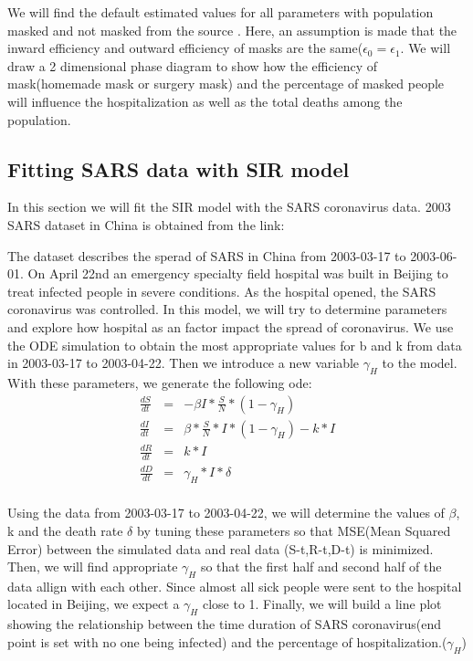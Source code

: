 \documentclass{article}
\begin{document}
We will find the default estimated values for all parameters with population masked and not masked from the source \cite{Steff2020mask}.
Here, an assumption is made that the inward efficiency and outward efficiency of masks are the same($\epsilon_{0} = \epsilon_{1}$. We will draw a 2 dimensional phase diagram to show how the efficiency of mask(homemade mask or surgery mask) and the percentage of masked people will influence the hospitalization as well as the total deaths among the population.






\subsection{Fitting SARS data with SIR model}
In this section we will fit the SIR model with the SARS coronavirus data. 2003 SARS dataset in China is obtained from the link:\cite{SARSsource}

The dataset describes the sperad of SARS in China from 2003-03-17 to 2003-06-01. On April 22nd an emergency specialty field hospital was built in Beijing to treat infected people in severe conditions. As the hospital opened, the SARS coronavirus was controlled. In this model, we will try to determine parameters and explore how hospital as an factor impact the spread of coronavirus. We use the ODE simulation to obtain the most appropriate values for b and k from data in 2003-03-17 to 2003-04-22. Then we introduce a new variable $\gamma_{H}$ to the model. With these parameters, we generate the following ode:
\begin{eqnarray}
  \frac{dS}{dt} &=& -\beta I*\frac{S}{N}*(1-\gamma_{H})\\
  \frac{dI}{dt} &=& \beta *\frac{S}{N}*I*(1-\gamma_{H})- k*I\\
  \frac{dR}{dt} &=& k*I\\
  \frac{dD}{dt} &=& \gamma_{H}*I*\delta\\
\end{eqnarray}

Using the data from 2003-03-17 to 2003-04-22, we will determine the values of $\beta$, k and the death rate $\delta$ by tuning these parameters so that MSE(Mean Squared Error) between the simulated data and real data (S-t,R-t,D-t) is minimized. Then, we will find appropriate $\gamma_{H}$ so that the first half and second half of the data allign with each other. Since almost all sick people were sent to the hospital located in Beijing, we expect a $\gamma_{H}$ close to 1.
Finally, we will build a line plot showing the relationship between the time duration of SARS coronavirus(end point is set with no one being infected) and the percentage of hospitalization.($\gamma_{H}$)
\end{document}
